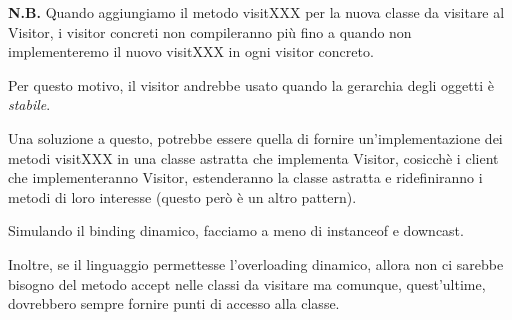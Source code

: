 \medskip
\textbf{N.B.} Quando aggiungiamo il metodo visitXXX per la nuova classe da visitare al Visitor, i visitor concreti non compileranno più fino a quando non 
implementeremo il nuovo visitXXX in ogni visitor concreto.
\medskip

Per questo motivo, il visitor andrebbe usato quando la gerarchia degli oggetti è \textit{stabile}.

Una soluzione a questo, potrebbe essere quella di fornire un'implementazione dei metodi visitXXX in una classe astratta che implementa Visitor, cosicchè i client che 
implementeranno Visitor, estenderanno la classe astratta e ridefiniranno i metodi di loro interesse (questo però è un altro pattern).

Simulando il binding dinamico, facciamo a meno di instanceof e downcast.

Inoltre, se il linguaggio permettesse l'overloading dinamico, allora non ci sarebbe bisogno del metodo accept nelle classi da visitare ma comunque, quest'ultime, 
dovrebbero sempre fornire punti di accesso alla classe.